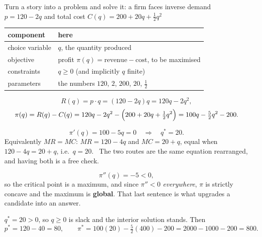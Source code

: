 \begin{worked}{Turn a story into a problem and solve it: a firm faces inverse demand $p=120-2q$ and total cost $C(q)=200+20q+\tfrac12q^{2}$}
\begin{center}\footnotesize
\begin{tabular}{ll}
  \hline
  component & here\\
  \hline
  choice variable & $q$, the quantity produced\\
  objective & profit $\pi(q)=\text{revenue}-\text{cost}$, to be maximised\\
  constraints & $q\ge0$ (and implicitly $q$ finite)\\
  parameters & the numbers $120$, $2$, $200$, $20$, $\tfrac12$\\
  \hline
\end{tabular}
\end{center}

\[
  R(q)=p\cdot q=(120-2q)q=120q-2q^{2} ,
\]
\[
  \pi(q)=R(q)-C(q)=120q-2q^{2}-\Bigl(200+20q+\tfrac12q^{2}\Bigr)
        =100q-\tfrac52q^{2}-200 .
\]

\[
  \pi'(q)=100-5q=0
  \quad\Longrightarrow\quad
  q^{*}=20 .
\]
Equivalently $MR=MC$: $MR=120-4q$ and $MC=20+q$, equal when
$120-4q=20+q$, i.e.\ $q=20$. \checkmark\ The two routes are the same
equation rearranged, and having both is a free check.

\[
  \pi''(q)=-5<0 ,
\]
so the critical point is a maximum, and since $\pi''<0$ \emph{everywhere},
$\pi$ is strictly concave and the maximum is \textbf{global}. That last
sentence is what upgrades a candidate into an answer.

$q^{*}=20>0$, so $q\ge0$ is slack and the interior solution stands. Then
\[
  p^{*}=120-40=80,
  \qquad
  \pi^{*}=100(20)-\tfrac52(400)-200=2000-1000-200=800 .
\]


\end{worked}
